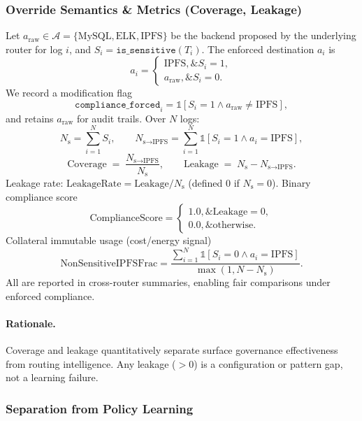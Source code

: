 \subsubsection{Override Semantics \& Metrics (Coverage, Leakage)}\label{s:compliance-metrics}

Let $a_{\text{raw}} \in \mathcal{A} = \{\text{MySQL}, \text{ELK}, \text{IPFS}\}$ be the backend proposed by the underlying router for log $i$, and $S_i = \texttt{is\_sensitive}(T_i)$. The enforced destination $a_i$ is
\[
a_i =
\begin{cases}
\text{IPFS},\& S_i = 1,\\
a_{\text{raw}},\& S_i = 0.
\end{cases}
\]
We record a modification flag
\[
\texttt{compliance\_forced}_i = \mathbb{1}[S_i = 1 \land a_{\text{raw}} \neq \text{IPFS}],
\]
and retains $a_{\text{raw}}$ for audit trails. Over $N$ logs:
\[
N_{\text{s}} = \sum_{i=1}^{N} S_i,\qquad
N_{\text{s}\rightarrow \text{IPFS}} = \sum_{i=1}^{N} \mathbb{1}[S_i = 1 \land a_i = \text{IPFS}],
\]
\[
\text{Coverage} \;=\; \frac{N_{\text{s}\rightarrow \text{IPFS}}}{N_{\text{s}}}, \qquad
\text{Leakage} \;=\; N_{\text{s}} - N_{\text{s}\rightarrow \text{IPFS}}.
\]
Leakage rate: $\text{LeakageRate} = \text{Leakage}/N_{\text{s}}$ (defined $0$ if $N_{\text{s}}=0$). Binary compliance score
\[
\text{ComplianceScore} =
\begin{cases}
1.0,\& \text{Leakage}=0,\\
0.0,\& \text{otherwise}.
\end{cases}
\]
Collateral immutable usage (cost/energy signal)
\[
\text{NonSensitiveIPFSFrac} = \frac{\sum_{i=1}^{N} \mathbb{1}[S_i = 0 \land a_i = \text{IPFS}]}{\max(1, N - N_{\text{s}})}.
\]
All are reported in cross-router summaries, enabling fair comparisons under enforced compliance.

\paragraph{Rationale.}
Coverage and leakage quantitatively separate surface governance effectiveness from routing intelligence. Any leakage ($>0$) is a configuration or pattern gap, not a learning failure.

\subsubsection{Separation from Policy Learning}\label{s:compliance-separation}


